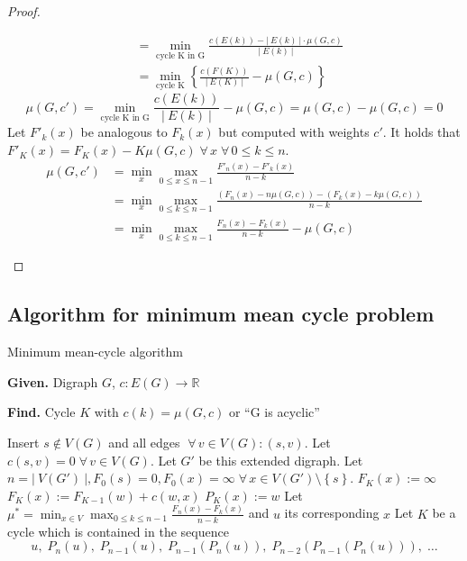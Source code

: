 \documentclass[a4paper]{article}
\theoremstyle{definition}
\newcommand{\card}[1]{\left|\:\!#1\:\!\right|}
\newcommand{\set}[1]{\left\{#1\right\}}
\newcommand{\given}[1]{\textbf{Given.} #1\par}
\newcommand{\find}[1]{\textbf{Find.} #1\par}
\newcommand{\fall}{\;\forall\,}
\begin{document}
\begin{proof}
\begin{enumerate}
\begin{enumerate}
\begin{align*}
                     &= \min_{\text{cycle K in G}} \frac{c(E(k)) - \card{E(k)} \cdot \mu(G, c)}{\card{E(k)}} \\
                     &= \min_{\text{cycle K}}\set{\frac{c(F(K))}{\card{E(K)}} - \mu(G, c)}
        \end{align*} \[
          \mu(G, c') = \min_{\text{cycle K in G}} \frac{c(E(k))}{\card{E(k)}} - \mu(G, c) = \mu(G, c) - \mu(G, c) = 0
        \]
        Let $F'_k(x)$ be analogous to $F_k(x)$ but computed with weights $c'$.
        It holds that $F'_K(x) = F_K(x) - K \mu(G, c) \fall x \fall 0 \leq k \leq n$.
        \begin{align*}
          \mu(G, c')
            &= \min_x \max_{0 \leq x \leq n-1} \frac{F'_n(x) - F'_k(x)}{n-k} \\
            &= \min_x \max_{0 \leq k \leq n-1} \frac{(F_n(x) - n\mu(G, c)) - (F_k(x) - k\mu(G, c))}{n-k} \\
            &= \min_x \max_{0 \leq k \leq n-1} \frac{F_n(x) - F_k(x)}{n-k} - \mu(G, c)
        \end{align*}
    \end{enumerate}
\end{enumerate}
\end{proof}

\subsection{Algorithm for minimum mean cycle problem}
%
\begin{algorithm}
  \caption{Minimum mean-cycle algorithm}
  \label{mmc-algo}
  \given{Digraph $G$, $c: E(G) \rightarrow \mathbb{R}$}
  \find{Cycle $K$ with $c(k) = \mu(G, c)$ or ``G is acyclic''}
\begin{algorithmic}[1]
  \State Insert $s \notin V(G)$ and all edges $\fall v \in V(G): (s, v)$. Let $c(s, v) = 0 \fall v \in V(G)$. Let $G'$ be this extended digraph.
  \State Let $n = \card{V(G')}, F_0(s) = 0, F_0(x) = \infty \fall x \in V(G') \setminus \set{s}$.
      \State $F_K(x) := \infty$
          \State $F_K(x) := F_{K-1}(w) + c(w, x)$
          \State $P_K(x) := w$
        \EndIf
      \EndFor
    \EndFor
  \EndFor
  \If{$F_n(x) := \infty \fall x \in V(G') \setminus \set{s}$}
    \State {}
  \EndIf
  \State Let $\mu^* = \min_{x \in V} \max_{0 \leq k \leq n-1} \frac{F_n(x) - F_k(x)}{n-k}$ and $u$ its corresponding $x$
  \State Let $K$ be a cycle which is contained in the sequence
    \[
      u,\;P_n(u),\;P_{n-1}(u),\;P_{n-1}(P_n(u)),\;P_{n-2}(P_{n-1}(P_n(u))),\;\ldots
    \]
  \State {}
\end{algorithmic}
\end{algorithm}
\end{document}
